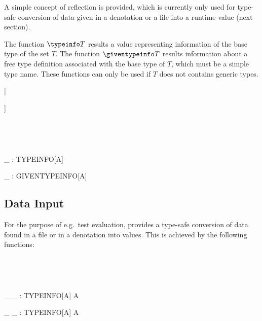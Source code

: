 \documentclass{article}
\begin{document}
A simple concept of reflection is provided, which is currently only
used for type-safe conversion of data given in a denotation or a file
into a runtime value (next section).

The function $\typeinfo T$ results a value representing
information of the base type of the set $T$. The function
$\giventypeinfo T$ results information about a free type
definition associated with the base type of $T$, which must
be a simple type name. These functions can only be used
if $T$ does not contains generic types.


\begin{zedgroup}
\begin{zed}
  [TYPEINFO[A]]
\end{zed}
\begin{zed}
  [GIVENTYPEINFO[A]]
\end{zed}
\begin{zdirectives}
   \\
\end{zdirectives} \\
\begin{axdef}[A]
  \typeinfo \_ : TYPEINFO[A] \\
\end{axdef}
\begin{axdef}[A]
  \giventypeinfo \_ : GIVENTYPEINFO[A]
\end{axdef}
\end{zedgroup}

\subsection{Data Input}

For the purpose of e.g.~test evaluation, \ZAP{} provides
a type-safe conversion of data found in a file or in a denotation
into values. This is achieved by the following functions:

\begin{zedgroup}
\begin{zdirectives}
  \\
\end{zdirectives} \\
\begin{axdef}[A]
  \_ \fromfile \_ : TYPEINFO[A] \cross \denotation \pfun \seq A
\end{axdef}
\begin{axdef}[A]
  \_ \fromdeno \_ : TYPEINFO[A] \cross \denotation \pfun \seq A
\end{axdef}
\end{zedgroup}
\end{document}
